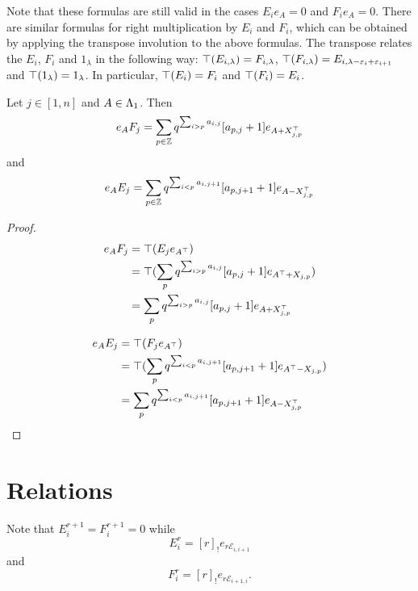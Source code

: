 \documentclass[a4paper, 11pt]{report}
\begin{document}
Note that these formulas are still valid in the cases $E_ie_A=0$ and $F_ie_A=0$. There are similar formulas for right multiplication by $E_i$ and $F_i$, which can be obtained by applying the transpose involution to the above formulas. The transpose relates the $E_i$, $F_i$ and $1_\lambda$ in the following way: $\top(E_{i,\lambda}) = F_{i,\lambda}$, $\top(F_{i,\lambda}) = E_{i,\lambda -\varepsilon_i +\varepsilon_{i+1}}$ and $\top(1_\lambda) = 1_\lambda$. In particular, $\top(E_i) = F_i$ and $\top(F_i) = E_i$.

\begin{corollary}
Let $j\in [1,n]$ and $A\in{\Lambda_1}$. Then
\begin{equation*}
e_A F_j = \sum_{p\in\mathbb{Z}} q^{\sum_{i>p} a_{i,j}}[a_{p,j}+1] e_{A+X_{j,p}^{\top}}
\end{equation*}
and
\begin{equation*}
e_A E_j = \sum_{p\in\mathbb{Z}} q^{\sum_{i<p} a_{i,j+1}}[a_{p,j+1}+1] e_{A-X_{j,p}^{\top}}
\end{equation*}
\end{corollary}
\begin{proof}
\begin{align*}
e_A F_j &= \top (E_j e_{A^\top})\\
&= \top ( \sum_p q^{\sum_{i>p} a_{i,j}}[a_{p,j}+1] e_{A^\top + X_{j,p}} )\\
&= \sum_p q^{\sum_{i>p} a_{i,j}} [a_{p,j}+1] e_{A+X_{j,p}^{\top}}
\end{align*}

\begin{align*}
e_A E_j &= \top (F_j e_{A^\top})\\
&= \top ( \sum_p q^{\sum_{i<p} a_{i,j+1}} [a_{p,j+1}+1] e_{A^\top - X_{j,p}} )\\
&= \sum_p q^{\sum_{i<p} a_{i,j+1}}[a_{p,j+1}+1] e_{A-X_{j,p}^{\top}}
\end{align*}
\end{proof}

\section{Relations}

Note that $E_i^{r+1}=F_i^{r+1}=0$ while
\begin{equation*}
E_i^r = [r]_! e_{r\mathcal{E}_{i,i+1}}
\end{equation*}
and
\begin{equation*}
F_i^r = [r]_! e_{r\mathcal{E}_{i+1,i}}.
\end{equation*}
\end{document}

